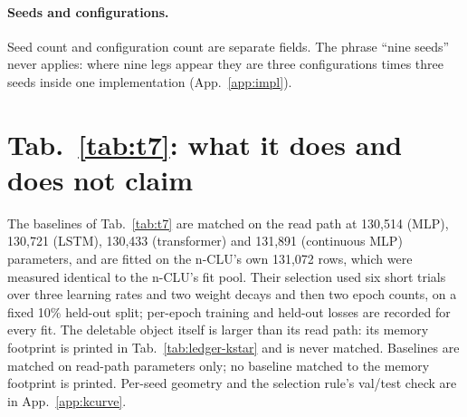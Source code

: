 \documentclass{article} %
\begin{document}
\paragraph{Seeds and configurations.} Seed count and configuration count are separate fields. The
phrase ``nine seeds'' never applies: where nine legs appear they are three configurations times
three seeds inside one implementation (App.~\ref{app:impl}).

\section{Tab.~\ref{tab:t7}: what it does and does not claim}
\label{app:t7more}
The baselines of Tab.~\ref{tab:t7} are matched on the read path at 130,514 (MLP), 130,721 (LSTM), %
130,433 (transformer) and 131,891 (continuous MLP) parameters, and are fitted on the n-CLU's own %
131,072 rows, which were measured identical to the n-CLU's fit pool. Their selection used six short %
trials over three learning rates and two weight decays and then two epoch counts, on a fixed 10\%
held-out split; per-epoch training and held-out losses are recorded for every fit. %
The deletable object itself is larger than its read path: its memory footprint is printed
in Tab.~\ref{tab:ledger-kstar} and is never matched. Baselines are matched on read-path
parameters only; no baseline matched to the memory footprint is printed.
Per-seed geometry and the selection rule's val/test check are in App.~\ref{app:kcurve}.
\end{document}
